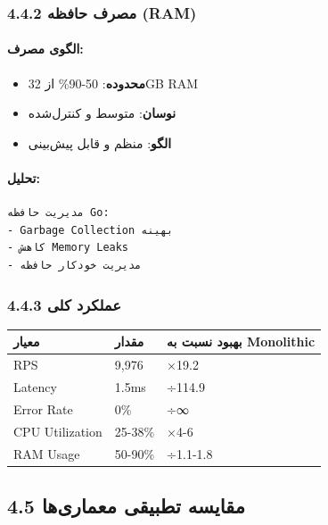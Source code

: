 \documentclass[
]{article}
\newcounter{none} %
\providecommand{\tightlist}{%
  \setlength{\itemsep}{0pt}\setlength{\parskip}{0pt}}
\begin{document}
\subsubsection{4.4.2 مصرف حافظه
(RAM)}\label{ux645ux635ux631ux641-ux62dux627ux641ux638ux647-ram-2}

\paragraph{الگوی
مصرف:}\label{ux627ux644ux6afux648ux6cc-ux645ux635ux631ux641-2}

\begin{itemize}
\tightlist
\item
  \textbf{محدوده}: 50-90\% از 32GB RAM
\item
  \textbf{نوسان}: متوسط و کنترل‌شده
\item
  \textbf{الگو}: منظم و قابل پیش‌بینی
\end{itemize}

\paragraph{تحلیل:}\label{ux62aux62dux644ux6ccux644-5}

\begin{verbatim}
مدیریت حافظه Go:
- Garbage Collection بهینه
- کاهش Memory Leaks
- مدیریت خودکار حافظه
\end{verbatim}

\subsubsection{4.4.3 عملکرد
کلی}\label{ux639ux645ux644ux6a9ux631ux62f-ux6a9ux644ux6cc-2}

{\def\LTcaptype{none} %
\begin{longtable}[]{@{}lll@{}}
\toprule\noalign{}
معیار & مقدار & بهبود نسبت به Monolithic \\
\midrule\noalign{}
\endhead
\bottomrule\noalign{}
\endlastfoot
RPS & 9,976 & ×19.2 \\
Latency & 1.5ms & ÷114.9 \\
Error Rate & 0\% & ÷∞ \\
CPU Utilization & 25-38\% & ×4-6 \\
RAM Usage & 50-90\% & ÷1.1-1.8 \\
\end{longtable}
}

\subsection{4.5 مقایسه تطبیقی
معماری‌ها}\label{ux645ux642ux627ux6ccux633ux647-ux62aux637ux628ux6ccux642ux6cc-ux645ux639ux645ux627ux631ux6ccux647ux627}
\end{document}
